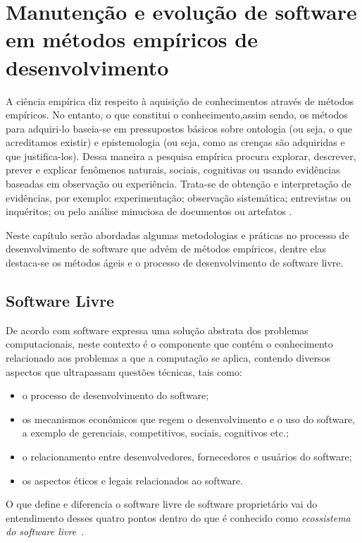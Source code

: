 \section{Manutenção e evolução de software em métodos empíricos de desenvolvimento}

A ciência empírica diz respeito à aquisição de conhecimentos através de métodos empíricos. No entanto, o que constitui o conhecimento,assim sendo, os métodos para adquiri-lo baseia-se em pressupostos básicos sobre ontologia (ou seja, o que acreditamos existir) e epistemologia (ou seja, como as crenças são adquiridas e que justifica-los). Dessa maneira a pesquisa empírica procura explorar, descrever, prever e explicar fenômenos naturais, sociais, cognitivas ou usando evidências baseadas em observação ou experiência. Trata-se de obtenção e interpretação de evidências, por exemplo: experimentação; observação sistemática; entrevistas ou inquéritos; ou pelo análise minuciosa de documentos ou artefatos \cite{sjoberg2007future}.

Neste capítulo serão abordadas algumas metodologias e práticas no processo de desenvolvimento de software que advém de métodos empíricos, dentre elas destaca-se os métodos ágeis e o processo de desenvolvimento de software livre.

\subsection{Software Livre}
\label{soft-livre}

De acordo com \cite{meirelles2013} software expressa uma solução abstrata dos problemas computacionais, neste contexto é o componente que contém o conhecimento relacionado aos problemas a que a computação se aplica, contendo diversos aspectos que ultrapassam questões técnicas, tais como:
\begin{itemize}
\item o processo de desenvolvimento do software;
\item os mecanismos econômicos que regem o desenvolvimento e o uso do software, a exemplo de gerenciais, competitivos, sociais, cognitivos etc.;
\item o relacionamento entre desenvolvedores, fornecedores e usuários do software;
\item os aspectos éticos e legais relacionados ao software.
\end{itemize}

O que define e diferencia o software livre de software proprietário vai do entendimento desses quatro pontos dentro do que é conhecido como \textit{ecossistema do software livre}~\cite{meirelles2013}.

